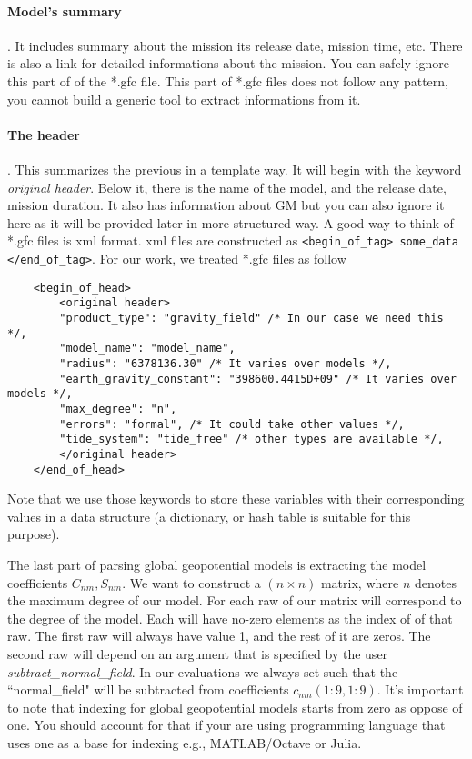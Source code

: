 	\paragraph{Model's summary}. It includes summary about the mission its release date, mission time, etc. There is also a link for detailed informations about the mission. You can safely ignore this part of of the *.gfc file. This part of *.gfc files does not follow any pattern, you cannot build a generic tool to extract informations from it.
	\paragraph{The header}. This summarizes the previous in a template way. It will begin with the keyword \textit{original header}. Below it, there is the name of the model, and the release date, mission duration. It also has information about GM but you can also ignore it here as it will be provided later in more structured way. A good way to think of *.gfc files is xml format. xml files are constructed as \lstinline|<begin_of_tag> some_data </end_of_tag>|. For our work, we treated *.gfc files as follow
	\begin{lstlisting}
	<begin_of_head>
		<original header>
		"product_type": "gravity_field" /* In our case we need this */,
		"model_name": "model_name",
		"radius": "6378136.30" /* It varies over models */,
		"earth_gravity_constant": "398600.4415D+09" /* It varies over models */,
		"max_degree": "n",
		"errors": "formal", /* It could take other values */,
		"tide_system": "tide_free" /* other types are available */,
		</original header>
	</end_of_head>
	\end{lstlisting}
	
	Note that we use those keywords to store these variables with their corresponding values in a data structure (a dictionary, or hash table is suitable for this purpose).
	
	The last part of parsing global geopotential models is extracting the model coefficients $C_{nm}, S_{nm}$. We want to construct a $(n \times n)$ matrix, where $n$ denotes the maximum degree of our model. For each raw of our matrix will correspond to the degree of the model. Each will have no-zero elements as the index of of that raw. The first raw will always have value 1, and the rest of it are zeros. The second raw will depend on an argument that is specified by the user \textit{subtract\_normal\_field}. In our evaluations we always set such that the ``normal\_field" will be subtracted from coefficients $c_{nm}(1:9,1:9)$. It's important to note that indexing for global geopotential models starts from zero as oppose of one. You should account for that if your are using programming language that uses one as a base for indexing e.g., MATLAB/Octave or Julia.
	
